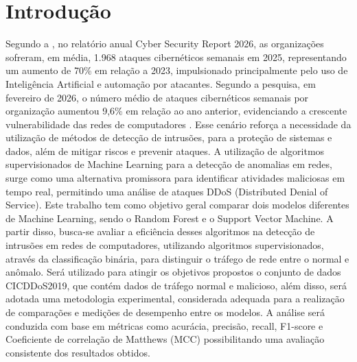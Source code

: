 \documentclass[
    12pt,                %
    openright,           %
    oneside,             %
    a4paper,             %
    english,             %
    brazil               %
]{abntex2}
\begin{document}


\tableofcontents*
\cleardoublepage

\textual

\chapter{Introdução}
\label{cap:introducao}

Segundo a , no relatório anual Cyber Security Report 2026, as organizações sofreram, em média, 1.968 ataques cibernéticos semanais em 2025, representando um aumento de 70\% em relação a 2023, impulsionado principalmente pelo uso de Inteligência Artificial e automação por atacantes. Segundo a pesquisa, em fevereiro de 2026, o número médio de ataques cibernéticos semanais por organização aumentou 9,6\% em relação ao ano anterior, evidenciando a crescente vulnerabilidade das redes de computadores \cite{CheckPoint2026}.
Esse cenário reforça a necessidade da utilização de métodos de detecção de intrusões, para a proteção de sistemas e dados, além de mitigar riscos e prevenir ataques.
A utilização de algoritmos supervisionados de Machine Learning para a detecção de anomalias em redes, surge como uma alternativa promissora para identificar atividades maliciosas em tempo real, permitindo uma análise de ataques DDoS (Distributed Denial of Service).
Este trabalho tem como objetivo geral comparar dois modelos diferentes de Machine Learning, sendo o Random Forest e o Support Vector Machine. A partir disso, busca-se avaliar a eficiência desses algoritmos na detecção de intrusões em redes de computadores, utilizando algoritmos supervisionados, através da classificação binária, para distinguir o tráfego de rede entre o normal e anômalo.
Será utilizado para atingir os objetivos propostos o conjunto de dados CICDDoS2019, que contém dados de tráfego normal e malicioso, além disso, será adotada uma metodologia experimental, considerada adequada para a realização de comparações e medições de desempenho entre os modelos. A análise será conduzida com base em métricas como acurácia, precisão, recall, F1-score e Coeficiente de correlação de Matthews (MCC) possibilitando uma avaliação consistente dos resultados obtidos.
\end{document}
